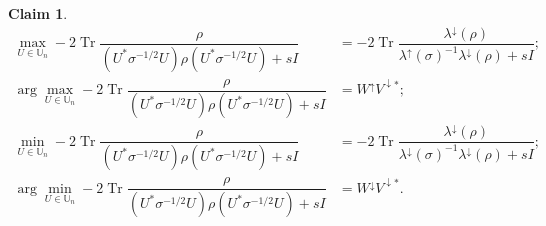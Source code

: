 \documentclass[10pt,reqno]{amsart}
\theoremstyle{break-italic}
\theoremstyle{break-italic}
\theoremstyle{break-italic}
\theoremstyle{break-italic}
\theoremstyle{break-italic}
\theoremstyle{break-italic}
\theoremstyle{break-italic}
\theoremstyle{break-italic}
\theoremstyle{break-roman}
\theoremstyle{standard}
\newtheorem{claim}[satz]{Claim}
\theoremstyle{varthm-roman}
\theoremstyle{varthm-italic}
\theoremstyle{varthm-roman-break}
\theoremstyle{varthm-italic-break}
\theoremstyle{varthm-roman-no-punctuation}
\theoremstyle{varthm-italic-no-punctuation}
\numberwithin{equation}{section}
\begin{document}
\begin{claim}\label{claimrho}
\begin{align*}
\max_{U\in\mathbb U_n} -2 \operatorname{Tr}\dfrac{\rho}{(U^*\sigma^{-1/2}U)\rho(U^*\sigma^{-1/2}U)+sI}&=-2\operatorname{Tr}\dfrac{\lambda^\downarrow(\rho)}{\lambda^\uparrow(\sigma)^{-1}\lambda^\downarrow(\rho)+sI};\\
\arg\max_{U\in\mathbb U_n} -2 \operatorname{Tr}\dfrac{\rho}{(U^*\sigma^{-1/2}U)\rho(U^*\sigma^{-1/2}U)+sI}&=W^\uparrow V^{\downarrow*};\\
\min_{U\in\mathbb U_n} -2 \operatorname{Tr}\dfrac{\rho}{(U^*\sigma^{-1/2}U)\rho(U^*\sigma^{-1/2}U)+sI}&=-2\operatorname{Tr}\dfrac{\lambda^\downarrow(\rho)}{\lambda^\downarrow(\sigma)^{-1}\lambda^\downarrow(\rho)+sI};\\
\arg\min_{U\in\mathbb U_n} -2 \operatorname{Tr}\dfrac{\rho}{(U^*\sigma^{-1/2}U)\rho(U^*\sigma^{-1/2}U)+sI}&=W^\downarrow V^{\downarrow*}.
\end{align*}
\end{claim}
\end{document}
